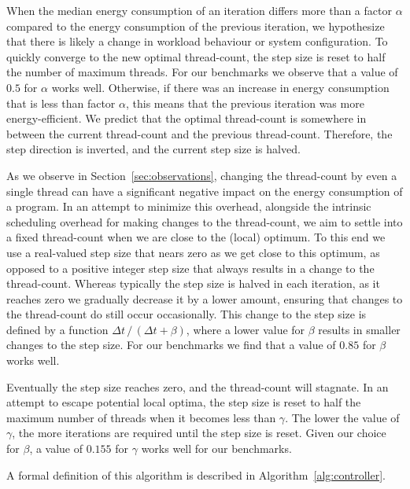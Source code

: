 When the median energy consumption of an iteration differs more than a factor $\alpha$ compared to
the energy consumption of the previous iteration, we hypothesize that there is likely a change in
workload behaviour or system configuration. To quickly converge to the new optimal thread-count, the
step size is reset to half the number of maximum threads. For our benchmarks we observe that a value
of $0.5$ for $\alpha$ works well. Otherwise, if there was an increase in energy consumption that is
less than factor $\alpha$, this means that the previous iteration was more energy-efficient. We
predict that the optimal thread-count is somewhere in between the current thread-count and the
previous thread-count. Therefore, the step direction is inverted, and the current step size is
halved.

As we observe in Section~\ref{sec:observations}, changing the thread-count by even a single thread
can have a significant negative impact on the energy consumption of a program. In an attempt to
minimize this overhead, alongside the intrinsic scheduling overhead for making changes to the
thread-count, we aim to settle into a fixed thread-count when we are close to the (local) optimum.
To this end we use a real-valued step size that nears zero as we get close to this optimum, as
opposed to a positive integer step size that always results in a change to the thread-count. Whereas
typically the step size is halved in each iteration, as it reaches zero we gradually decrease it by
a lower amount, ensuring that changes to the thread-count do still occur occasionally. This change
to the step size is defined by a function $\Delta t\, /\, (\Delta t + \beta)$, where a lower value
for $\beta$ results in smaller changes to the step size. For our benchmarks we find that a value of
$0.85$ for $\beta$ works well.

Eventually the step size reaches zero, and the thread-count will stagnate. In an attempt to escape
potential local optima, the step size is reset to half the maximum number of threads when it becomes
less than $\gamma$. The lower the value of $\gamma$, the more iterations are required until the step
size is reset. Given our choice for $\beta$, a value of $0.155$ for $\gamma$ works well for our
benchmarks.

A formal definition of this algorithm is described in Algorithm~\ref{alg:controller}.

